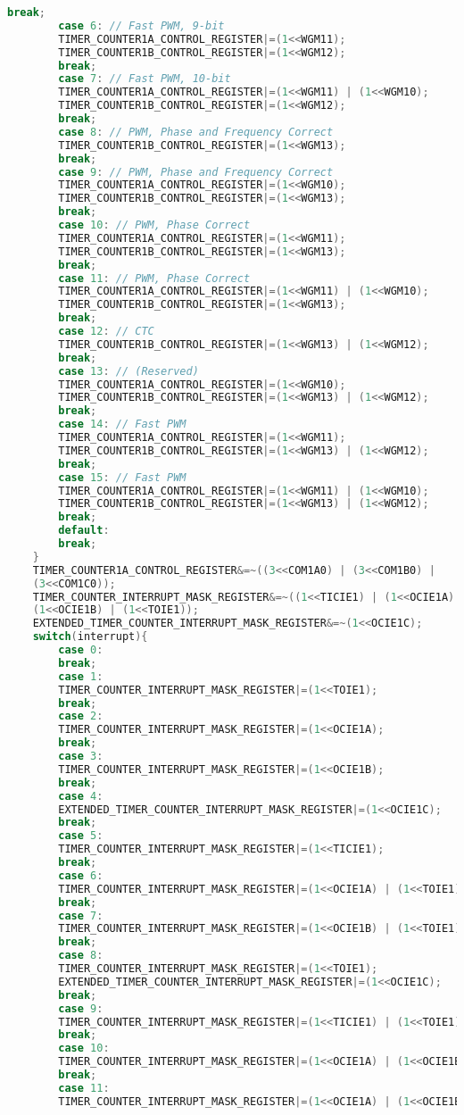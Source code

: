 \begin{lstlisting}[language=C, caption={atmega128timer.c}, label=atmega128timer-c, captionpos=b]
		break;
		case 6:	// Fast PWM, 9-bit
		TIMER_COUNTER1A_CONTROL_REGISTER|=(1<<WGM11);
		TIMER_COUNTER1B_CONTROL_REGISTER|=(1<<WGM12);
		break;
		case 7:	// Fast PWM, 10-bit
		TIMER_COUNTER1A_CONTROL_REGISTER|=(1<<WGM11) | (1<<WGM10);
		TIMER_COUNTER1B_CONTROL_REGISTER|=(1<<WGM12);
		break;
		case 8:	// PWM, Phase and Frequency Correct
		TIMER_COUNTER1B_CONTROL_REGISTER|=(1<<WGM13);
		break;
		case 9:	// PWM, Phase and Frequency Correct
		TIMER_COUNTER1A_CONTROL_REGISTER|=(1<<WGM10);
		TIMER_COUNTER1B_CONTROL_REGISTER|=(1<<WGM13);
		break;
		case 10: // PWM, Phase Correct
		TIMER_COUNTER1A_CONTROL_REGISTER|=(1<<WGM11);
		TIMER_COUNTER1B_CONTROL_REGISTER|=(1<<WGM13);
		break;
		case 11: // PWM, Phase Correct
		TIMER_COUNTER1A_CONTROL_REGISTER|=(1<<WGM11) | (1<<WGM10);
		TIMER_COUNTER1B_CONTROL_REGISTER|=(1<<WGM13);
		break;
		case 12: // CTC
		TIMER_COUNTER1B_CONTROL_REGISTER|=(1<<WGM13) | (1<<WGM12);
		break;
		case 13: // (Reserved)
		TIMER_COUNTER1A_CONTROL_REGISTER|=(1<<WGM10);
		TIMER_COUNTER1B_CONTROL_REGISTER|=(1<<WGM13) | (1<<WGM12);
		break;
		case 14: // Fast PWM
		TIMER_COUNTER1A_CONTROL_REGISTER|=(1<<WGM11);
		TIMER_COUNTER1B_CONTROL_REGISTER|=(1<<WGM13) | (1<<WGM12);
		break;
		case 15: // Fast PWM
		TIMER_COUNTER1A_CONTROL_REGISTER|=(1<<WGM11) | (1<<WGM10);
		TIMER_COUNTER1B_CONTROL_REGISTER|=(1<<WGM13) | (1<<WGM12);
		break;
		default:
		break;
	}
	TIMER_COUNTER1A_CONTROL_REGISTER&=~((3<<COM1A0) | (3<<COM1B0) |
	(3<<COM1C0));
	TIMER_COUNTER_INTERRUPT_MASK_REGISTER&=~((1<<TICIE1) | (1<<OCIE1A) |
	(1<<OCIE1B) | (1<<TOIE1));
	EXTENDED_TIMER_COUNTER_INTERRUPT_MASK_REGISTER&=~(1<<OCIE1C);
	switch(interrupt){
		case 0:
		break;
		case 1:
		TIMER_COUNTER_INTERRUPT_MASK_REGISTER|=(1<<TOIE1);
		break;
		case 2:
		TIMER_COUNTER_INTERRUPT_MASK_REGISTER|=(1<<OCIE1A);
		break;
		case 3:
		TIMER_COUNTER_INTERRUPT_MASK_REGISTER|=(1<<OCIE1B);
		break;
		case 4:
		EXTENDED_TIMER_COUNTER_INTERRUPT_MASK_REGISTER|=(1<<OCIE1C);
		break;
		case 5:
		TIMER_COUNTER_INTERRUPT_MASK_REGISTER|=(1<<TICIE1);
		break;
		case 6:
		TIMER_COUNTER_INTERRUPT_MASK_REGISTER|=(1<<OCIE1A) | (1<<TOIE1);
		break;
		case 7:
		TIMER_COUNTER_INTERRUPT_MASK_REGISTER|=(1<<OCIE1B) | (1<<TOIE1);
		break;
		case 8:
		TIMER_COUNTER_INTERRUPT_MASK_REGISTER|=(1<<TOIE1);
		EXTENDED_TIMER_COUNTER_INTERRUPT_MASK_REGISTER|=(1<<OCIE1C);
		break;
		case 9:
		TIMER_COUNTER_INTERRUPT_MASK_REGISTER|=(1<<TICIE1) | (1<<TOIE1);
		break;
		case 10:
		TIMER_COUNTER_INTERRUPT_MASK_REGISTER|=(1<<OCIE1A) | (1<<OCIE1B) | (1<<TOIE1);
		break;
		case 11:
		TIMER_COUNTER_INTERRUPT_MASK_REGISTER|=(1<<OCIE1A) | (1<<OCIE1B) | (1<<TOIE1);

\end{lstlisting}

